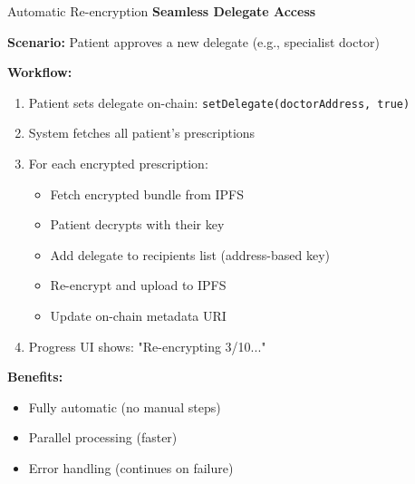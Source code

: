 \documentclass[10pt]{beamer}
\begin{document}
\begin{frame}{Automatic Re-encryption}
\textbf{Seamless Delegate Access}

\vspace{0.2cm}
\textbf{Scenario:} Patient approves a new delegate (e.g., specialist doctor)

\vspace{0.2cm}
\textbf{Workflow:}
\begin{enumerate}
\item Patient sets delegate on-chain: \texttt{setDelegate(doctorAddress, true)}
\item System fetches all patient's prescriptions
\item For each encrypted prescription:
    \begin{itemize}
    \item Fetch encrypted bundle from IPFS
    \item Patient decrypts with their key
    \item Add delegate to recipients list (address-based key)
    \item Re-encrypt and upload to IPFS
    \item Update on-chain metadata URI
    \end{itemize}
\item Progress UI shows: "Re-encrypting 3/10..."
\end{enumerate}

\vspace{0.2cm}
\textbf{Benefits:}
\begin{itemize}
\item Fully automatic (no manual steps)
\item Parallel processing (faster)
\item Error handling (continues on failure)
\end{itemize}
\end{frame}
\end{document}
